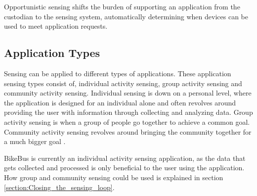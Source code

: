 \begin{defi}
Opportunistic sensing shifts the burden of supporting an application from the custodian to the sensing system, automatically determining when devices can be used to meet application requests. \cite{Lane:2008:USS:1411759.1411763} 
\end{defi}



\subsection{Application Types}
\label{section:Mobile_Sensing_Application_Types}

Sensing can be applied to different types of applications. These application sensing types consist of, individual activity sensing, group activity sensing and community activity sensing. Individual sensing is down on a personal level, where the application is designed for an individual alone and often revolves around providing the user with information through collecting and analyzing data. Group activity sensing is when a group of people go together to achieve a common goal. Community activity sensing revolves around bringing the community together for a much bigger goal \cite{Lane:2010:SMP:1866991.1867010}.

BikeBus is currently an individual activity sensing application, as the data that gets collected and processed is only beneficial to the user using the application. How group and community sensing could be used is explained in section \ref{section:Closing_the_sensing_loop}.


